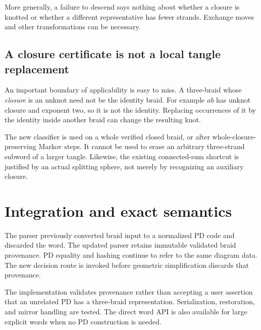 \documentclass[11pt,letterpaper]{article}
\theoremstyle{definition}
\begin{document}
More generally, a failure to descend says nothing about whether a closure
is knotted or whether a different representative has fewer strands.
Exchange moves and other transformations can be necessary.

\subsection{A closure certificate is not a local tangle replacement}

An important boundary of applicability is easy to miss. A three-braid
whose \emph{closure} is an unknot need not be the identity braid.
For example \(ab\) has unknot closure and exponent two, so it is not the
identity. Replacing occurrences of it by the identity inside another
braid can change the resulting knot.

The new classifier is used on a whole verified closed braid, or after
whole-closure-preserving Markov steps. It cannot be used to erase an
arbitrary three-strand subword of a larger tangle. Likewise, the existing
connected-sum shortcut is justified by an actual splitting sphere, not
merely by recognizing an auxiliary closure.

\section{Integration and exact semantics}
\label{sec:implementation}

The parser previously converted braid input to a normalized PD code and
discarded the word. The updated parser retains immutable validated braid
provenance. PD equality and hashing continue to refer to the same diagram
data. The new decision route is invoked before geometric simplification
discards that provenance.

The implementation validates provenance rather than accepting a user
assertion that an unrelated PD has a three-braid representation.
Serialization, restoration, and mirror handling are tested.
The direct word API is also available for large explicit words when no
PD construction is needed.
\end{document}
